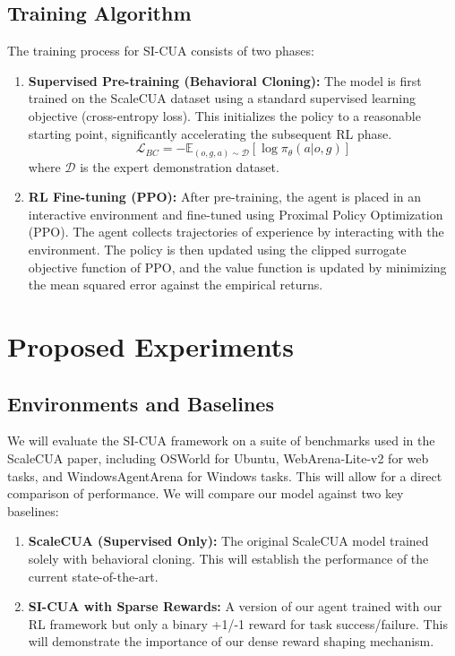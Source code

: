 \documentclass{article}
\begin{document}
\subsection{Training Algorithm}
The training process for SI-CUA consists of two phases:
\begin{enumerate}
    \item \textbf{Supervised Pre-training (Behavioral Cloning):} The model is first trained on the ScaleCUA dataset using a standard supervised learning objective (cross-entropy loss). This initializes the policy to a reasonable starting point, significantly accelerating the subsequent RL phase.
    \begin{equation}
        \mathcal{L}_{BC} = - \mathbb{E}_{(o, g, a) \sim \mathcal{D}} [\log \pi_\theta(a | o, g)]
    \end{equation}
    where $\mathcal{D}$ is the expert demonstration dataset.
    \item \textbf{RL Fine-tuning (PPO):} After pre-training, the agent is placed in an interactive environment and fine-tuned using Proximal Policy Optimization (PPO). The agent collects trajectories of experience by interacting with the environment. The policy is then updated using the clipped surrogate objective function of PPO, and the value function is updated by minimizing the mean squared error against the empirical returns.
\end{enumerate}

\section{Proposed Experiments}
\subsection{Environments and Baselines}
We will evaluate the SI-CUA framework on a suite of benchmarks used in the ScaleCUA paper, including OSWorld for Ubuntu, WebArena-Lite-v2 for web tasks, and WindowsAgentArena for Windows tasks. This will allow for a direct comparison of performance. We will compare our model against two key baselines:
\begin{enumerate}
    \item \textbf{ScaleCUA (Supervised Only):} The original ScaleCUA model trained solely with behavioral cloning. This will establish the performance of the current state-of-the-art.
    \item \textbf{SI-CUA with Sparse Rewards:} A version of our agent trained with our RL framework but only a binary +1/-1 reward for task success/failure. This will demonstrate the importance of our dense reward shaping mechanism.
\end{enumerate}
\end{document}
